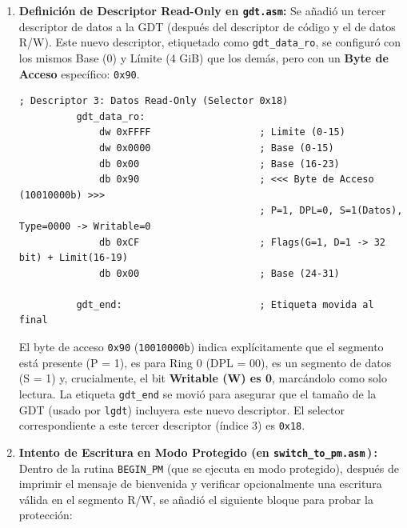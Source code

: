 \begin{enumerate}
    \item \textbf{Definición de Descriptor Read-Only en \texttt{gdt.asm}:}
          Se añadió un tercer descriptor de datos a la GDT (después del descriptor de código y el de datos R/W).
          Este nuevo descriptor, etiquetado como \texttt{gdt\_data\_ro}, se configuró con los mismos Base (0)
          y Límite (4 GiB) que los demás, pero con un \textbf{Byte de Acceso} específico: \texttt{0x90}.
  
          \begin{lstlisting}[style=NasmStyle,
            caption={Descriptor Read-Only en \texttt{gdt.asm}},
            numbers=none,
            breaklines=true
          ]
          ; Descriptor 3: Datos Read-Only (Selector 0x18)
          gdt_data_ro:
              dw 0xFFFF                   ; Limite (0-15)
              dw 0x0000                   ; Base (0-15)
              db 0x00                     ; Base (16-23)
              db 0x90                     ; <<< Byte de Acceso (10010000b) >>>
                                          ; P=1, DPL=0, S=1(Datos), Type=0000 -> Writable=0
              db 0xCF                     ; Flags(G=1, D=1 -> 32 bit) + Limit(16-19)
              db 0x00                     ; Base (24-31)
          
          gdt_end:                        ; Etiqueta movida al final
          \end{lstlisting}
  
          El byte de acceso \texttt{0x90} (\texttt{10010000b}) indica explícitamente que el segmento
          está presente (P = 1), es para Ring 0 (DPL = 00), es un segmento de datos (S = 1) y,
          crucialmente, el bit \textbf{Writable (W) es 0}, marcándolo como solo lectura.
          La etiqueta \texttt{gdt\_end} se movió para asegurar que el tamaño de la GDT (usado por
          \texttt{lgdt}) incluyera este nuevo descriptor.  
          El selector correspondiente a este tercer descriptor (índice 3) es \texttt{0x18}.
  
    \item \textbf{Intento de Escritura en Modo Protegido (en
          \texttt{switch\_to\_pm.asm}\,)\,:} %
          Dentro de la rutina \texttt{BEGIN\_PM} (que se ejecuta en modo protegido), después de imprimir el
          mensaje de bienvenida y verificar opcionalmente una escritura válida en el segmento R/W,
          se añadió el siguiente bloque para probar la protección:
  

\end{enumerate}
